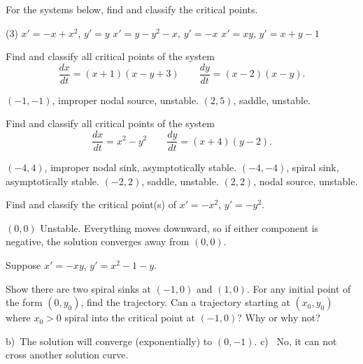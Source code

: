 \begin{exercise}\ansMark%
For the systems below, find and classify the critical points.
\begin{tasks}(3)
\task $x'=-x+x^2$, $y'=y$
\task $x'=y-y^2-x$, $y'=-x$
\task $x'=xy$, $y'=x+y-1$
\end{tasks}
\end{exercise}

\begin{exercise}
Find and classify all critical points of the system
\[ \frac{dx}{dt} = (x+1)(x-y+3) \qquad \frac{dy}{dt} = (x-2)(x-y) .\]
\end{exercise}
\comboSol{%
}
{%
$(-1, -1)$, improper nodal source, unstable. $(2,5)$, saddle, unstable.
}

\begin{exercise}
Find and classify all critical points of the system
\[ \frac{dx}{dt} = x^2 - y^2 \qquad \frac{dy}{dt} = (x+4)(y-2) .\]
\end{exercise}
\comboSol{%
}
{%
$(-4, 4)$, improper nodal sink, asymptotically stable. $(-4, -4)$, spiral sink, asymptotically stable. $(-2, 2)$, saddle, unstable. $(2,2)$, nodal source, unstable.
}


\begin{exercise}
Find and classify the critical point(s) of $x' = -x^2$, $y' = -y^2$.
\end{exercise}
\comboSol{%
}
{%
$(0,0)$ Unstable. Everything moves downward, so if either component is negative, the solution converges away from $(0,0)$.
}

\begin{samepage}
\begin{exercise}
Suppose $x'=-xy$, $y'=x^2-1-y$.
\begin{tasks}
\task
Show there are two spiral sinks at
$(-1,0)$ and $(1,0)$.
\task
For any initial point of the form $(0,y_0)$, find the trajectory.
\task
Can a trajectory starting at $(x_0,y_0)$ where $x_0 > 0$ spiral into 
the critical point at $(-1,0)$?  Why or why not?
\end{tasks}
\end{exercise}
\end{samepage}
\comboSol{%
}
{%
b)~The solution will converge (exponentially) to $(0, -1)$. \quad c)~ No, it can not cross another solution curve.
}

